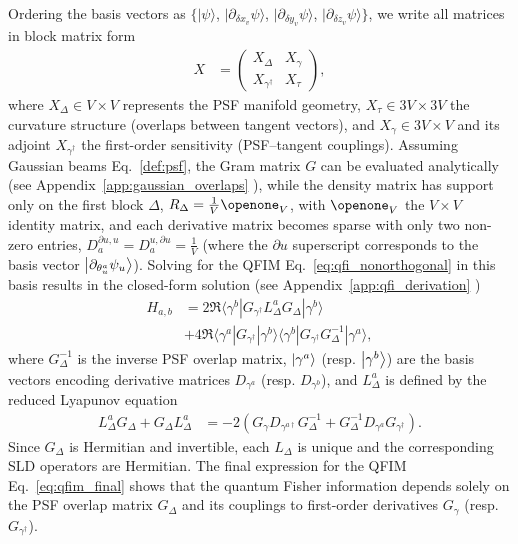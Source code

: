 \documentclass[reprint,amsmath,amssymb,aps,prl,floatfix,groupedaddress,superscriptaddress]{revtex4-2}
\begin{document}
Ordering the basis vectors as $\big\{|{\psi}\rangle$, $|{\partial_{\delta x_v} \psi}\rangle$, $|{\partial_{\delta y_v} \psi}\rangle$, $|{\partial_{\delta z_v} \psi}\rangle\big\}$, we write all matrices in block matrix form
\begin{align}\label{eatlean}
    X &= \begin{pmatrix}
        X_\Delta & X_\gamma\\
        X_{\gamma^\dagger} & X_\tau
    \end{pmatrix},
\end{align}
where $X_\Delta \in V \times V$ represents the PSF manifold geometry, $X_\tau \in 3V \times 3V$ the curvature structure (overlaps between tangent vectors), and $X_\gamma \in 3V \times V$ and its adjoint $X_{\gamma^\dagger}$ the first-order sensitivity (PSF–tangent couplings).
Assuming Gaussian beams Eq.~\eqref{def:psf}, the Gram matrix $G$ can be evaluated analytically (see Appendix~\ref{app:gaussian_overlaps} \cite{supposta}),
while the density matrix has support only on the first block $\Delta$, $R_\Delta = \frac{1}{V} \openone_V$,
with $\openone_V$ the $V\times V$ identity matrix, and each derivative matrix becomes sparse with only two non-zero entries,
    $D_a^{\partial u,u} = D_a^{u,\partial u} = \frac{1}{V}$ (where the $\partial u$ superscript corresponds to the basis vector $\ket{\partial_{\theta_u^a} \psi_u}$).
Solving for the QFIM Eq.~\eqref{eq:qfi_nonorthogonal} in this basis results in the closed-form solution (see Appendix~\ref{app:qfi_derivation} \cite{supposta})
\begin{align}
    H_{a,b} &= 2 \Re \langle{\gamma^b}| G_{\gamma^\dagger} L^a_\Delta G_\Delta |{\gamma^b}\rangle \nonumber\\
    &+ 4 \Re \langle{\gamma^a}|G_{\gamma^\dagger}|{\gamma^b}\rangle\langle{\gamma^b}|G_{\gamma^\dagger} G^{-1}_\Delta|{\gamma^a}\rangle,
    \label{eq:qfim_final}
\end{align}
where $G^{-1}_\Delta$ is the inverse PSF overlap matrix, $\ket{\gamma^a}$ (resp. $\ket{\gamma^b}$) are the basis vectors encoding derivative matrices $D_{\gamma^{a}}$ (resp. $D_{\gamma^{b}}$), and $L^a_\Delta$ is defined by the reduced Lyapunov equation
\begin{align}
    L^a_{\Delta} G_{\Delta} + G_{\Delta} L^a_{\Delta}  &= -2 (G_{\gamma}D_{\gamma^{a\dagger}}G_\Delta^{-1} + G_\Delta^{-1} D_{\gamma^a}G_{\gamma^\dagger}).
    \label{eq:L_delta_sylvester}
\end{align}
Since $G_\Delta$ is Hermitian and invertible, each $L_\Delta$ is unique and the corresponding SLD operators are Hermitian. The final expression for the QFIM Eq.~\eqref{eq:qfim_final} shows that the quantum Fisher information depends solely on the PSF overlap matrix $G_\Delta$ and its couplings to first-order derivatives  $G_{\gamma} $ (resp. $G_{\gamma^\dagger}$). %
\end{document}
